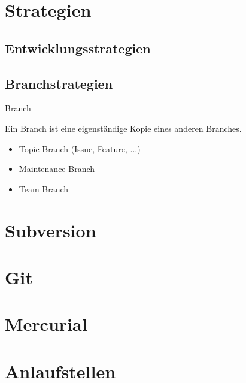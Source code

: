\documentclass[presentation]{beamer}
\begin{document}
\section{Strategien}
\subsection{Entwicklungsstrategien}
\subsection{Branchstrategien}
\begin{frame}{Branch}
  \begin{definition}
    Ein \alert{Branch} ist eine eigenständige Kopie eines anderen Branches.
  \end{definition}
\end{frame}
\begin{frame}
  \begin{itemize}[<+->]
  \item Topic Branch (Issue, Feature, ...)
  \item Maintenance Branch
  \item Team Branch
  \end{itemize}
\end{frame}

\section{Subversion}
\section{Git}
\section{Mercurial}

\section{Anlaufstellen}
\end{document}
